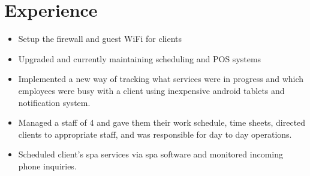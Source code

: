 \documentclass[12pt,letterpaper,sans]{moderncv}        %
\begin{document}
\section{Experience}
{\begin{itemize}%
\item Setup the firewall and guest WiFi for clients
\item Upgraded and currently maintaining scheduling and POS systems
\item Implemented a new way of tracking what services were in progress and which employees were busy with a client using inexpensive android tablets and notification system.
\end{itemize}}
{\begin{itemize}%
\item Managed a staff of 4 and gave them their work schedule, time sheets, directed clients to appropriate staff, and was responsible for day to day operations.
\item Scheduled client’s spa services via spa software and monitored incoming phone inquiries.
\end{itemize} }
\end{document}
